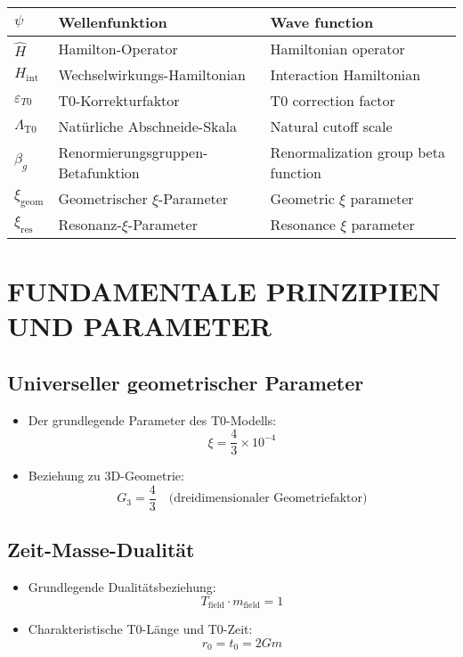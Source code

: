 \documentclass[12pt,a4paper]{article}
\begin{document}
\begin{longtable}{|p{}|p{}|p{}|}
		\hline
		$\psi$ & Wellenfunktion & Wave function \\
		\hline
		$\hat{H}$ & Hamilton-Operator & Hamiltonian operator \\
		\hline
		$H_{\text{int}}$ & Wechselwirkungs-Hamiltonian & Interaction Hamiltonian \\
		\hline
		$\varepsilon_{T0}$ & T0-Korrekturfaktor & T0 correction factor \\
		\hline
		$\Lambda_{\text{T0}}$ & Natürliche Abschneide-Skala & Natural cutoff scale \\
		\hline
		$\beta_g$ & Renormierungsgruppen-Betafunktion & Renormalization group beta function \\
		\hline
		$\xi_{\text{geom}}$ & Geometrischer $\xi$-Parameter & Geometric $\xi$ parameter \\
		\hline
		$\xi_{\text{res}}$ & Resonanz-$\xi$-Parameter & Resonance $\xi$ parameter \\
		\hline
	\end{longtable}
	
	
	\newpage
	\tableofcontents
	\newpage
	
	\section{FUNDAMENTALE PRINZIPIEN UND PARAMETER}
	
	\subsection{Universeller geometrischer Parameter}
	\begin{itemize}
		\item Der grundlegende Parameter des T0-Modells:
		\begin{equation}
			\xi = \frac{4}{3} \times 10^{-4}
		\end{equation}
		
		\item Beziehung zu 3D-Geometrie:
		\begin{equation}
			G_3 = \frac{4}{3} \quad \text{(dreidimensionaler Geometriefaktor)}
		\end{equation}
	\end{itemize}
	
	\subsection{Zeit-Masse-Dualität}
	\begin{itemize}
		\item Grundlegende Dualitätsbeziehung:
		\begin{equation}
			T_{\text{field}} \cdot m_{\text{field}} = 1
		\end{equation}
		
		\item Charakteristische T0-Länge und T0-Zeit:
		\begin{equation}
			r_0 = t_0 = 2Gm
		\end{equation}
	\end{itemize}
	
\end{document}
